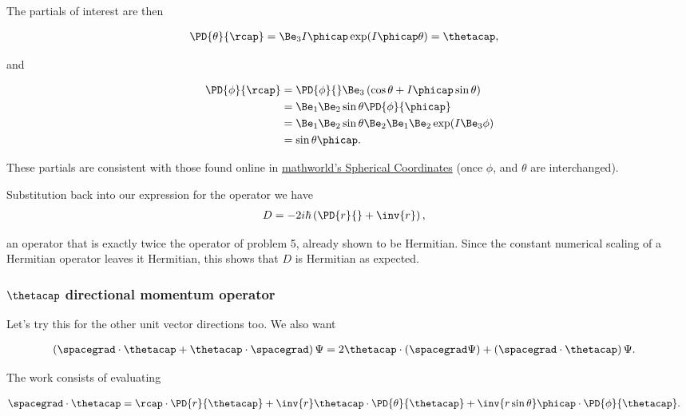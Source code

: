 The partials of interest are then

\begin{align*}
\PD{\theta}{\rcap} &= \Be_3 I \phicap \exp( I \phicap \theta ) = \thetacap,
\end{align*}

and

\begin{align*}
\PD{\phi}{\rcap} 
&= \PD{\phi}{} \Be_3 \left( \cos\theta + I \phicap \sin\theta \right) \\
&= \Be_1 \Be_2 \sin\theta \PD{\phi}{\phicap} \\
&= \Be_1 \Be_2 \sin\theta \Be_2 \Be_1 \Be_2 \exp( I \Be_3 \phi ) \\
&= \sin\theta \phicap.
\end{align*}

These partials are consistent with those found online in \href{http://mathworld.wolfram.com/SphericalCoordinates.html}{mathworld's Spherical Coordinates} (once $\phi$, and $\theta$ are interchanged).

Substitution back into our expression for the operator we have
\begin{align*}
D &= - 2 i \hbar \left( \PD{r}{} + \inv{r} \right),
\end{align*}

an operator that is exactly twice the operator of problem 5, already shown to be Hermitian.  Since the constant numerical scaling of a Hermitian operator leaves it Hermitian, this shows that $D$ is Hermitian as expected.

\subsubsection{$\thetacap$ directional momentum operator}

Let's try this for the other unit vector directions too.  We also want

\begin{align*}
\left( \spacegrad \cdot \thetacap + \thetacap \cdot \spacegrad \right) \Psi
&=
2 \thetacap \cdot (\spacegrad \Psi) + \left( \spacegrad \cdot \thetacap \right) \Psi.
\end{align*}

The work consists of evaluating

\begin{align*}
\spacegrad \cdot \thetacap 
&= \rcap \cdot \PD{r}{\thetacap}
+ \inv{r} \thetacap \cdot \PD{\theta}{\thetacap}
+ \inv{r \sin\theta} \phicap \cdot \PD{\phi}{\thetacap}.
\end{align*}

